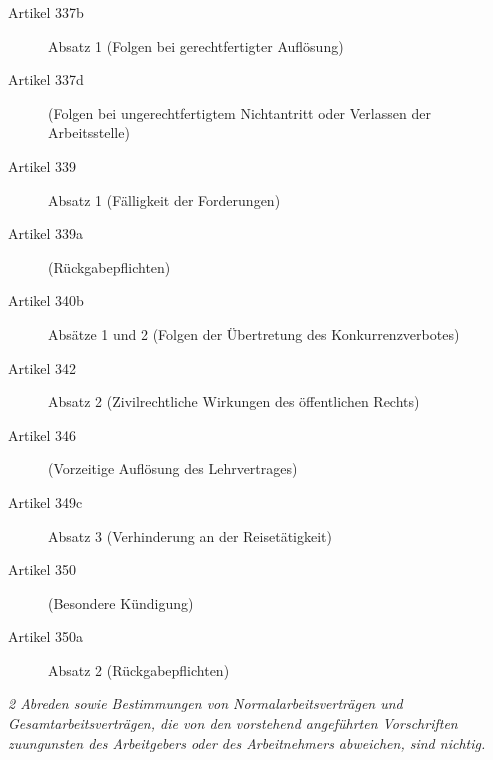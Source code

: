 \begin{description}
    \item[Artikel 337b]
    Absatz 1 (Folgen bei gerechtfertigter Auflösung)

    \item[Artikel 337d]
    (Folgen bei ungerechtfertigtem Nichtantritt oder Verlassen der Arbeitsstelle)

    \item[Artikel 339]
    Absatz 1 (Fälligkeit der Forderungen)

    \item[Artikel 339a]
    (Rückgabepflichten)

    \item[Artikel 340b]
    Absätze 1 und 2 (Folgen der Übertretung des Konkurrenzverbotes)

    \item[Artikel 342]
    Absatz 2 (Zivilrechtliche Wirkungen des öffentlichen Rechts)

    \item[Artikel 346]
    (Vorzeitige Auflösung des Lehrvertrages)

    \item[Artikel 349c]
    Absatz 3 (Verhinderung an der Reisetätigkeit)

    \item[Artikel 350]
    (Besondere Kündigung)

    \item[Artikel 350a]
    Absatz 2 (Rückgabepflichten)
\end{description}

\textit{2 Abreden sowie Bestimmungen von Normalarbeitsverträgen und Gesamtarbeitsverträgen, die von den vorstehend angeführten Vorschriften zuungunsten des Arbeitgebers oder des Arbeitnehmers abweichen, sind nichtig.}

